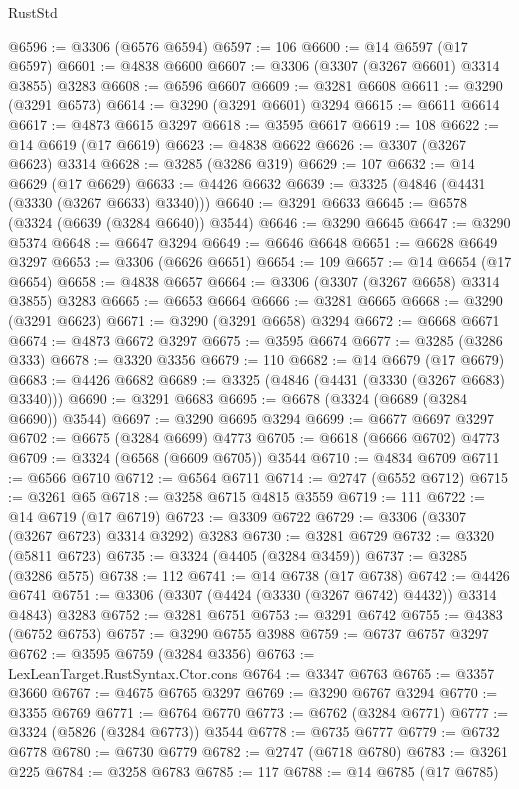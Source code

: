 \begin{lexlean}{RustStd}
\begin{coremodule}
@6596 := @3306 (@6576 @6594)
@6597 := 106
@6600 := @14 @6597 (@17 @6597)
@6601 := @4838 @6600
@6607 := @3306 (@3307 (@3267 @6601) @3314 @3855) @3283
@6608 := @6596 @6607
@6609 := @3281 @6608
@6611 := @3290 (@3291 @6573)
@6614 := @3290 (@3291 @6601) @3294
@6615 := @6611 @6614
@6617 := @4873 @6615 @3297
@6618 := @3595 @6617
@6619 := 108
@6622 := @14 @6619 (@17 @6619)
@6623 := @4838 @6622
@6626 := @3307 (@3267 @6623) @3314
@6628 := @3285 (@3286 @319)
@6629 := 107
@6632 := @14 @6629 (@17 @6629)
@6633 := @4426 @6632
@6639 := @3325 (@4846 (@4431 (@3330 (@3267 @6633) @3340)))
@6640 := @3291 @6633
@6645 := @6578 (@3324 (@6639 (@3284 @6640)) @3544)
@6646 := @3290 @6645
@6647 := @3290 @5374
@6648 := @6647 @3294
@6649 := @6646 @6648
@6651 := @6628 @6649 @3297
@6653 := @3306 (@6626 @6651)
@6654 := 109
@6657 := @14 @6654 (@17 @6654)
@6658 := @4838 @6657
@6664 := @3306 (@3307 (@3267 @6658) @3314 @3855) @3283
@6665 := @6653 @6664
@6666 := @3281 @6665
@6668 := @3290 (@3291 @6623)
@6671 := @3290 (@3291 @6658) @3294
@6672 := @6668 @6671
@6674 := @4873 @6672 @3297
@6675 := @3595 @6674
@6677 := @3285 (@3286 @333)
@6678 := @3320 @3356
@6679 := 110
@6682 := @14 @6679 (@17 @6679)
@6683 := @4426 @6682
@6689 := @3325 (@4846 (@4431 (@3330 (@3267 @6683) @3340)))
@6690 := @3291 @6683
@6695 := @6678 (@3324 (@6689 (@3284 @6690)) @3544)
@6697 := @3290 @6695 @3294
@6699 := @6677 @6697 @3297
@6702 := @6675 (@3284 @6699) @4773
@6705 := @6618 (@6666 @6702) @4773
@6709 := @3324 (@6568 (@6609 @6705)) @3544
@6710 := @4834 @6709
@6711 := @6566 @6710
@6712 := @6564 @6711
@6714 := @2747 (@6552 @6712)
@6715 := @3261 @65
@6718 := @3258 @6715 @4815 @3559
@6719 := 111
@6722 := @14 @6719 (@17 @6719)
@6723 := @3309 @6722
@6729 := @3306 (@3307 (@3267 @6723) @3314 @3292) @3283
@6730 := @3281 @6729
@6732 := @3320 (@5811 @6723)
@6735 := @3324 (@4405 (@3284 @3459))
@6737 := @3285 (@3286 @575)
@6738 := 112
@6741 := @14 @6738 (@17 @6738)
@6742 := @4426 @6741
@6751 := @3306 (@3307 (@4424 (@3330 (@3267 @6742) @4432)) @3314 @4843) @3283
@6752 := @3281 @6751
@6753 := @3291 @6742
@6755 := @4383 (@6752 @6753)
@6757 := @3290 @6755 @3988
@6759 := @6737 @6757 @3297
@6762 := @3595 @6759 (@3284 @3356)
@6763 := LexLeanTarget.RustSyntax.Ctor.cons
@6764 := @3347 @6763
@6765 := @3357 @3660
@6767 := @4675 @6765 @3297
@6769 := @3290 @6767 @3294
@6770 := @3355 @6769
@6771 := @6764 @6770
@6773 := @6762 (@3284 @6771)
@6777 := @3324 (@5826 (@3284 @6773)) @3544
@6778 := @6735 @6777
@6779 := @6732 @6778
@6780 := @6730 @6779
@6782 := @2747 (@6718 @6780)
@6783 := @3261 @225
@6784 := @3258 @6783
@6785 := 117
@6788 := @14 @6785 (@17 @6785)

\end{coremodule}
\end{lexlean}
